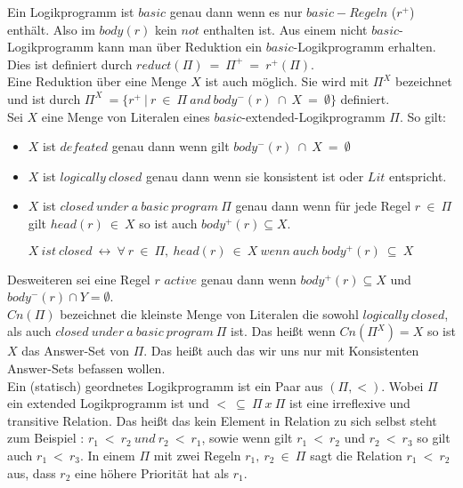 Ein Logikprogramm ist $basic$ genau dann wenn es nur 
$basic-Regeln$ ($r^+$) enthält. Also im $body(r)$ kein $not$ enthalten ist. Aus einem nicht $basic$-Logikprogramm kann
man über Reduktion ein $basic$-Logikprogramm erhalten. Dies ist definiert durch
$reduct(\Pi)~=~\Pi^+~=~r^+(\Pi)$. \\
  
Eine Reduktion über eine Menge $X$ ist auch möglich.
Sie wird mit $\Pi^X$ bezeichnet und ist durch
$\Pi^X~=\{r^+~|~r~\in~\Pi~and~body^-(r)~\cap~X~=~\emptyset \}$ definiert. \\

Sei $X$ eine Menge von Literalen eines $basic$-extended-Logikprogramm $\Pi$.
So gilt:

\begin{itemize}
	\item $X$ ist $defeated$ genau dann wenn gilt
    $body^-(r)~\cap~X~=~\emptyset$
	\item $X$ ist $logically~closed$ genau dann wenn sie konsistent ist oder
    $Lit$ entspricht.	
	\item $X$ ist $closed~under~a~basic~program~\Pi$ genau dann wenn für jede Regel
    $r~\in~\Pi$	gilt $head(r)~\in~X$ so ist auch $body^+(r) \subseteq X$.
	 	 \begin{center}
	     $X~ist~closed~\leftrightarrow~\forall~r~\in~\Pi,~head(r)~\in~X~wenn~auch~body^+(r)~\subseteq~X$ \\
     \end{center}
\end{itemize}

Desweiteren sei eine Regel $r$ $active$ genau dann wenn
$body^+(r) \subseteq X$ und $body^-(r) \cap Y = \emptyset$.\\

$Cn(\Pi)$ bezeichnet die kleinste Menge von Literalen die sowohl $logically~closed$,
als auch $closed~under~a~basic~program~\Pi$ ist. Das heißt wenn $Cn(\Pi^X)=X$
so ist $X$ das Answer-Set von $\Pi$. Das heißt auch das wir uns nur
mit Konsistenten Answer-Sets befassen wollen.\\

Ein (statisch) geordnetes Logikprogramm ist ein Paar aus $(\Pi,<)$.
Wobei $\Pi$ ein extended Logikprogramm ist und $<~\subseteq~\Pi~x~\Pi$ ist
eine irreflexive und transitive Relation. Das heißt das kein Element in Relation
zu sich selbst steht zum Beispiel : $r_1~<~r_2~ und~r_2~<~r_1$, sowie wenn
gilt $r_1~<~r_2$ und $r_2~<~r_3$ so gilt auch $r_1~<~r_3$.
In einem $\Pi$ mit zwei Regeln $r_1,~r_2~\in~\Pi$ sagt die Relation
$r_1~<~r_2$ aus, dass $r_2$ eine höhere Priorität hat als $r_1$.


